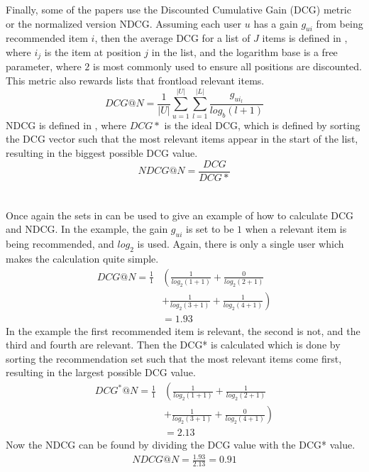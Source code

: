 Finally, some of the papers use the Discounted Cumulative Gain (DCG) metric or the normalized version NDCG.
Assuming each user $u$ has a gain $g_{ui}$ from being recommended item $i$, then the average DCG for a list of $J$ items is defined in , where $i_j$ is the item at position $j$ in the list, and the logarithm base is a free parameter, where $2$ is most commonly used to ensure all positions are discounted.
This metric also rewards lists that frontload relevant items.
\begin{equation}
    \label{eqn:dcg}
    DCG@N = \frac{1}{|U|} \sum\limits_{u=1}^{|U|} \sum\limits_{l = 1}^{|L|} \frac{g_{ui_l}}{log_b (l+1)}
\end{equation}
NDCG is defined in , where $DCG*$ is the ideal DCG, which is defined by sorting the DCG vector such that the most relevant items appear in the start of the list\cite{dcgpaper}, resulting in the biggest possible DCG value.
\begin{equation}
    \label{eqn:ndcg}
    NDCG@N = \frac{DCG}{DCG*}
\end{equation}
\\\\
Once again the sets in  can be used to give an example of how to calculate DCG and NDCG.
In the example, the gain $g_{ui}$ is set to be $1$ when a relevant item is being recommended, and $log_2$ is used.
Again, there is only a single user which makes the calculation quite simple.
\begin{align*}
    DCG@N = \frac{1}{1} &\left (\frac{1}{log_2 (1+1)} + \frac{0}{log_2 (2+1)} \right.\\
    & \left.+ \frac{1}{log_2 (3+1)} + \frac{1}{log_2 (4+1)}\right) \\
    & = 1.93
\end{align*}
In the example the first recommended item is relevant, the second is not, and the third and fourth are relevant.
Then the DCG* is calculated which is done by sorting the recommendation set such that the most relevant items come first, resulting in the largest possible DCG value.
\begin{align*}
    DCG^*@N = \frac{1}{1} &\left (\frac{1}{log_2 (1+1)} + \frac{1}{log_2 (2+1)} \right.\\
    & \left.+ \frac{1}{log_2 (3+1)} + \frac{0}{log_2 (4+1)}\right) \\
    & = 2.13
\end{align*}
Now the NDCG can be found by dividing the DCG value with the DCG* value.
\begin{align*}
    NDCG@N = \frac{1.93}{2.13} = 0.91
\end{align*}
